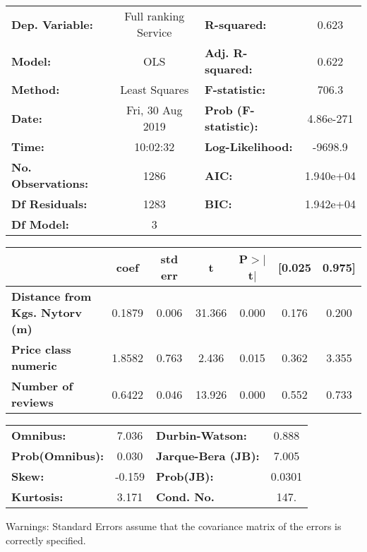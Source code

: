 \documentclass{report}
\begin{document}
\begin{center}
\begin{tabular}{lclc}
\toprule
\textbf{Dep. Variable:}                & Full ranking Service & \textbf{  R-squared:         } &     0.623   \\
\textbf{Model:}                        &         OLS          & \textbf{  Adj. R-squared:    } &     0.622   \\
\textbf{Method:}                       &    Least Squares     & \textbf{  F-statistic:       } &     706.3   \\
\textbf{Date:}                         &   Fri, 30 Aug 2019   & \textbf{  Prob (F-statistic):} & 4.86e-271   \\
\textbf{Time:}                         &       10:02:32       & \textbf{  Log-Likelihood:    } &   -9698.9   \\
\textbf{No. Observations:}             &          1286        & \textbf{  AIC:               } & 1.940e+04   \\
\textbf{Df Residuals:}                 &          1283        & \textbf{  BIC:               } & 1.942e+04   \\
\textbf{Df Model:}                     &             3        & \textbf{                     } &             \\
\bottomrule
\end{tabular}
\begin{tabular}{lcccccc}
                                       & \textbf{coef} & \textbf{std err} & \textbf{t} & \textbf{P$>$$|$t$|$} & \textbf{[0.025} & \textbf{0.975]}  \\
\midrule
\textbf{Distance from Kgs. Nytorv (m)} &       0.1879  &        0.006     &    31.366  &         0.000        &        0.176    &        0.200     \\
\textbf{Price class numeric}           &       1.8582  &        0.763     &     2.436  &         0.015        &        0.362    &        3.355     \\
\textbf{Number of reviews}             &       0.6422  &        0.046     &    13.926  &         0.000        &        0.552    &        0.733     \\
\bottomrule
\end{tabular}
\begin{tabular}{lclc}
\textbf{Omnibus:}       &  7.036 & \textbf{  Durbin-Watson:     } &    0.888  \\
\textbf{Prob(Omnibus):} &  0.030 & \textbf{  Jarque-Bera (JB):  } &    7.005  \\
\textbf{Skew:}          & -0.159 & \textbf{  Prob(JB):          } &   0.0301  \\
\textbf{Kurtosis:}      &  3.171 & \textbf{  Cond. No.          } &     147.  \\
\bottomrule
\end{tabular}
\end{center}

Warnings: \newline
 [1] Standard Errors assume that the covariance matrix of the errors is correctly specified.
\end{document}
